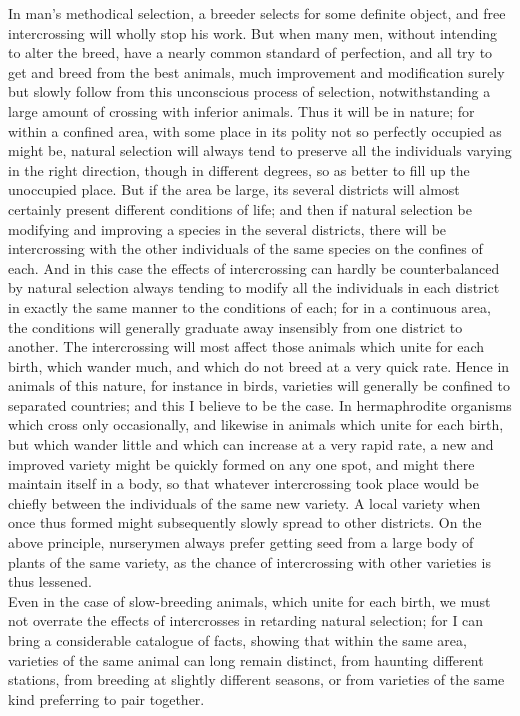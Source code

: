 \indent In man's methodical selection, a breeder selects for some definite object, and free intercrossing will wholly stop his work. But when many men, without intending to alter the breed, have a nearly common standard of perfection, and all try to get and breed from the best animals, much improvement and modification surely but slowly follow from this unconscious process of selection, notwithstanding a large amount of crossing with inferior animals. Thus it will be in nature; for within a confined area, with some place in its polity not so perfectly occupied as might be, natural selection will always tend to preserve all the individuals varying in the right direction, though in different degrees, so as better to fill up the unoccupied place. But if the area be large, its several districts will almost certainly present different conditions of life; and then if natural selection be modifying and improving a species in the several districts, there will be intercrossing with the other individuals of the same species on the confines of each. And in this case the effects of intercrossing can hardly be counterbalanced by natural selection always tending to modify all the individuals in each district in exactly the same manner to the conditions of each; for in a continuous area, the conditions will generally graduate away insensibly from one district to another. The intercrossing will most affect those animals which unite for each birth, which wander much, and which do not breed at a very quick rate. Hence in animals of this nature, for instance in birds, varieties will generally be confined to separated countries; and this I believe to be the case. In hermaphrodite organisms which cross only occasionally, and likewise in animals which unite for each birth, but which wander little and which can increase at a very rapid rate, a new and improved variety might be quickly formed on any one spot, and might there maintain itself in a body, so that whatever intercrossing took place would be chiefly between the individuals of the same new variety. A local variety when once thus formed might subsequently slowly spread to other districts. On the above principle, nurserymen always prefer getting seed from a large body of plants of the same variety, as the chance of intercrossing with other varieties is thus lessened. \\
\indent Even in the case of slow-breeding animals, which unite for each birth, we must not overrate the effects of intercrosses in retarding natural selection; for I can bring a considerable catalogue of facts, showing that within the same area, varieties of the same animal can long remain distinct, from haunting different stations, from breeding at slightly different seasons, or from varieties of the same kind preferring to pair together. \\
